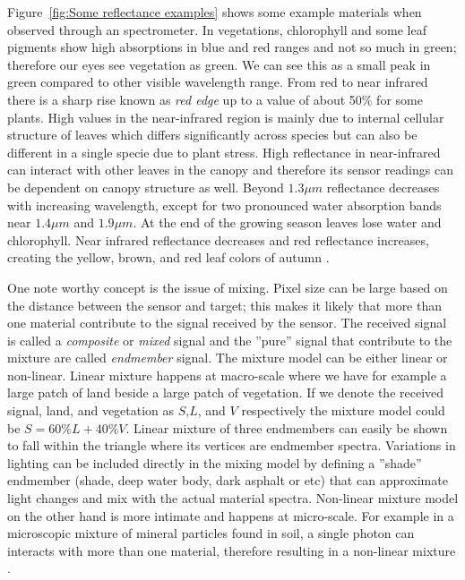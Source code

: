 Figure~\ref{fig:Some reflectance examples} shows some example materials when observed through an spectrometer. In vegetations, chlorophyll and some leaf pigments show high absorptions in blue and red ranges and not so much in green; therefore our eyes see vegetation as green. We can see this as a small peak in green compared to other visible wavelength range. From red to near infrared there is a sharp rise known as \textit{red edge} up to a value of about 50\% for some plants. High values in the near-infrared region is mainly due to internal cellular structure of leaves which differs significantly across species but can also be different in a single specie due to plant stress. High reflectance in near-infrared can interact with other leaves in the canopy and therefore its sensor readings can be dependent on canopy structure as well. Beyond  $1.3 \mu m$ reflectance decreases with increasing wavelength, except for two pronounced water absorption bands near $1.4 \mu m$ and  $1.9 \mu m$. At the end of the growing season leaves lose water and chlorophyll. Near infrared reflectance decreases and red reflectance increases, creating the yellow, brown, and red leaf colors of autumn \citep{smith2006introduction}.

One note worthy concept is the issue of mixing. Pixel size can be large based on the distance between the sensor and target; this makes it likely that more than one material contribute to the signal received by the sensor. The received signal is called a \textit{composite} or \textit{mixed} signal and the ''pure'' signal that contribute to the mixture are called \textit{endmember} signal. The mixture model can be either linear or non-linear. Linear mixture happens at macro-scale where we have for example a large patch of land beside a large patch of vegetation. If we denote the received signal, land, and vegetation as $S$,$L$, and $V$ respectively the mixture model could be  $S=60\%L+40\%V$. Linear mixture of three endmembers can easily be shown to fall within the triangle where its vertices are endmember spectra. Variations in lighting can be included directly in the mixing model by defining a ''shade'' endmember (shade, deep water body, dark asphalt or etc) that can approximate light changes and mix with the actual material spectra. Non-linear mixture model on the other hand is more intimate and happens at micro-scale. For example in a microscopic mixture of mineral particles found in soil, a single photon can interacts with more than one material, therefore resulting in a non-linear mixture \citep{keshava2003survey, bioucas2012hyperspectral, dobigeon2014nonlinear}.


